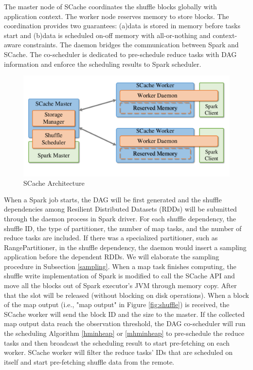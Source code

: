 The master node of SCache coordinates the shuffle blocks globally with application context. The worker node reserves memory to store blocks.
The coordination provides two guarantees: (a)data is stored in memory before tasks start and (b)data is scheduled on-off memory with all-or-nothing and context-aware constraints. 
The daemon bridges the communication between Spark and SCache. The co-scheduler is dedicated to pre-schedule reduce tasks with DAG information and enforce the scheduling results to Spark scheduler.
\begin{figure}
	\centering
	\includegraphics[width=0.8\linewidth]{fig/arch}
	\caption{SCache Architecture}
	\label{fig:arch}
	\vspace{-1em}
\end{figure}
When a Spark job starts, the DAG will be first generated and the shuffle dependencies among Resilient Distributed Datasets (RDDs) will be submitted through the daemon process in Spark driver. 
For each shuffle dependency, the shuffle ID, the type of partitioner, the number of map tasks, and the number of reduce tasks are included. 
If there was a specialized partitioner, such as RangePartitioner, in the shuffle dependency, the daemon would insert a sampling application before the dependent RDDs. 
We will elaborate the sampling procedure in Subsection \ref{sampling}.
When a map task finishes computing, the shuffle write implementation of Spark is modified to call the SCache API and move all the blocks out of Spark executor's JVM through memory copy. 
After that the slot will be released (without blocking on disk operations).
When a block of the map output (i.e., "map output" in Figure \ref{fig:shuffle}) is received, the SCache worker will send the block ID and the size to the master.
If the collected map output data reach the observation threshold, the DAG co-scheduler will run the scheduling Algorithm \ref{hminheap} or \ref{mhminheap} to pre-schedule the reduce tasks and then broadcast the scheduling result to start pre-fetching on each worker.
SCache worker will filter the reduce tasks' IDs that are scheduled on itself and start pre-fetching shuffle data from the remote. 

